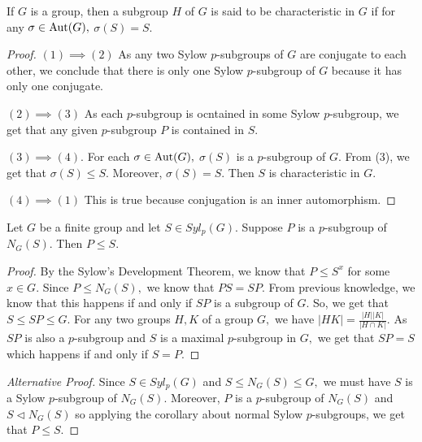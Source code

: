 \begin{definition}
	If $G$ is a group, then a subgroup $H$ of $G$ is said to be characteristic
	in $G$ if for any $ \sigma \in \operatorname{Aut}(G),$ $ \sigma(S) = S.$
\end{definition}

\begin{proof}
	$ (1) \implies (2) $
	As any two Sylow $p$\nobreakdash-subgroups of $G$ are conjugate to each other,
	we conclude that there is only one Sylow $p$\nobreakdash-subgroup of $G$
	because it has only one conjugate.
	
	$(2) \implies (3) $
	As each $p$\nobreakdash-subgroup is ocntained in some Sylow $p$\nobreakdash-subgroup,
	we get that any given $p$\nobreakdash-subgroup $P$ is contained in $S.$
	
	$(3) \implies (4).$
	For each $ \sigma \in \operatorname{Aut}(G),$
	$ \sigma (S) $ is a $p$\nobreakdash-subgroup of $G.$
	From (3), we get that $ \sigma(S) \leq S.$
	Moreover, $ \sigma(S) = S.$ Then $S$ is characteristic in $G.$

	$(4) \implies (1) $
	This is true because conjugation is an inner automorphism.
\end{proof}

\begin{lemma} \label{lem:p-subgroup-of-normaliser}
	Let $G$ be a finite group and let $S \in Syl_p(G).$
	Suppose $P$ is a $p$\nobreakdash-subgroup of $N_G(S).$
	Then $P \leq S.$
\end{lemma}

\begin{proof}
	By the Sylow's Development Theorem, we know that $P \leq S^x $
	for some $x \in G.$
	Since $P \leq N_G(S),$ we know that $PS = SP.$
	From previous knowledge, we know that this happens if and only if 
	$SP$ is a subgroup of $G.$
	So, we get that $S \leq SP \leq G.$
	For any two groups $H, K $ of a group $G,$ we have
	$ \lvert H K \rvert = \frac{ \lvert H \rvert \lvert K \rvert}{ \lvert H \cap K \rvert}.$
	As $SP$ is also a $p$\nobreakdash-subgroup and
	$S$ is a maximal $p$\nobreakdash-subgroup in $G,$ we get that 
	$SP = S$ which happens if and only if $S = P.$
\end{proof}

\begin{proof}[Alternative Proof]
	Since $S \in Syl_p(G)$ and $S \leq N_G(S) \leq G,$ we must have
	$S$ is a Sylow $p$\nobreakdash-subgroup of $N_G(S).$	
	Moreover, $P$ is a $p$\nobreakdash-subgroup of $N_G(S)$
	and $S \triangleleft N_G(S)$ so applying the corollary about normal Sylow
	$p$\nobreakdash-subgroups, we get that $P \leq S.$
\end{proof}

